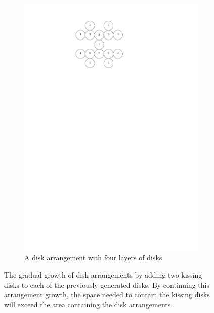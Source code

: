 \begin{figure}[h]
\begin{center}
\begin{subfigure}[b]{0.4\textwidth}
	  \includegraphics[width=\textwidth]{graphics/degree4arrangement.pdf}
	  \caption{A disk arrangement with four layers of disks}
	  \label{fig:circlePacking1-2}
  \end{subfigure}
\end{center} 
\caption{The gradual growth of disk arrangements by adding two kissing disks to each of the previously generated disks.  By continuing this arrangement growth, the space needed to contain the kissing disks will exceed the area containing the disk arrangements.}\label{fig:circlePacking-1}
\end{figure}
